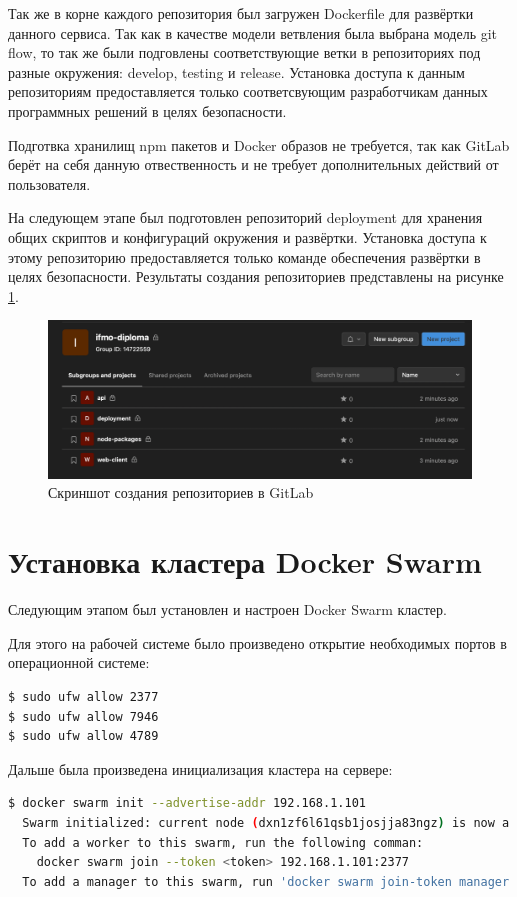 Так же в корне каждого репозитория был загружен Dockerfile для развёртки данного сервиса.
Так как в качестве модели ветвления была выбрана модель git flow, то так же были подговлены соответствующие ветки в репозиториях под разные окружения: develop, testing и release.
Установка доступа к данным репозиториям предоставляется только соответсвующим разработчикам данных программных решений в целях безопасности.

Подготвка хранилищ npm пакетов и Docker образов не требуется, так как GitLab берёт на себя данную отвественность и не требует дополнительных действий от пользователя.

На следующем этапе был подготовлен репозиторий deployment для хранения общих скриптов и конфигураций окружения и развёртки.
Установка доступа к этому репозиторию предоставляется только команде обеспечения развёртки в целях безопасности.
Результаты создания репозиториев представлены на рисунке \ref{fig:reps-ready}.

\begin{figure}[ht]
    \centering
    \includegraphics[scale=0.4]{figures/1}
    \caption{Скриншот создания репозиториев в GitLab}
    \label{fig:reps-ready}
\end{figure}

\section{Установка кластера Docker Swarm}

Следующим этапом был установлен и настроен Docker Swarm кластер.

Для этого на рабочей системе было произведено открытие необходимых портов в операционной системе\cite{linuxPocket}:
\begin{lstlisting}[language=bash,caption={Открытие портов в Linux}]
$ sudo ufw allow 2377
$ sudo ufw allow 7946
$ sudo ufw allow 4789
\end{lstlisting}

Дальше была произведена инициализация кластера на сервере:
\begin{lstlisting}[language=bash,caption={Инициализация кластера}]
$ docker swarm init --advertise-addr 192.168.1.101
  Swarm initialized: current node (dxn1zf6l61qsb1josjja83ngz) is now a manager.
  To add a worker to this swarm, run the following comman:
    docker swarm join --token <token> 192.168.1.101:2377
  To add a manager to this swarm, run 'docker swarm join-token manager' and follow the instructions.
\end{lstlisting}

